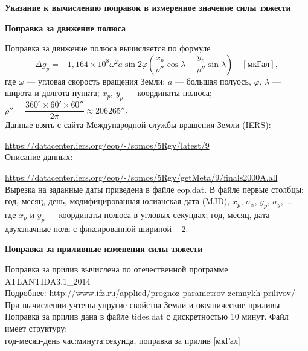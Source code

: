 \documentclass[11pt, a4paper,addpoints]{exam}
\theoremstyle{remark}
\renewcommand{\phi}{\ensuremath{\varphi}}
\begin{document}
\newpage
\thispagestyle{empty}
\begin{center}
    \textbf{Указание к вычислению поправок в измеренное значение силы тяжести}
\end{center}
\begin{flushleft}
    \textbf{Поправка за движение полюса} 
\end{flushleft}
Поправка за движение полюса вычисляется по формуле
    \begin{equation*}
            \Delta g_p = - 1,164\times 10^8 \omega^2 a \sin{2\phi} \left( \dfrac{x_p}{\rho''} \cos\lambda -
            \dfrac{y_p}{\rho''}\sin\lambda \right)\quad[\text{мкГал}],
        \end{equation*}
        где $\omega$ --- угловая скорость вращения Земли; $a$ --- большая полуось, $\phi$, $\lambda$ --- широта
        и долгота пункта; $x_p$, $y_p$ --- координаты полюса; $\rho'' = \dfrac{360^\circ \times 60'
        \times 60''}{2\pi} \approx 206265''$.\\
        Данные взять с сайта Международной службы вращения Земли (IERS):\par
        \url{https://datacenter.iers.org/eop/-/somos/5Rgv/latest/9}\\
        Описание данных:\par
        \url{https://datacenter.iers.org/eop/-/somos/5Rgv/getMeta/9/finals2000A.all} \\
        Вырезка на заданные даты приведена в файле \textrm{eop.dat}. В файле первые столбцы:\\
        год, месяц, день, модифицированная юлианская дата (MJD), $x_p$, $\sigma_x$, $y_p$, $\sigma_y$, \dots\\ 
        где $x_p$ и  $y_p$ --- координаты полюса в угловых секундах; год, месяц, дата - двухзначные поля
        с фиксированной шириной -- 2. 
\begin{flushleft}
    \textbf{Поправка за приливные изменения силы тяжести} 
\end{flushleft}
Поправка за прилив вычислена по отечественной программе ATLANTIDA3.1\_2014 \\
Подробнее: \url{http://www.ifz.ru/applied/prognoz-parametrov-zemnykh-prilivov/}\\
При вычислении учтены упругие свойства Земли и океанические приливы.\\
Поправка за прилив дана в файле \textrm{tides.dat} с дискретностью 10 минут. Файл имеет структуру:\\
год-месяц-день час:минута:секунда, поправка за прилив [мкГал]\\
\end{document}
